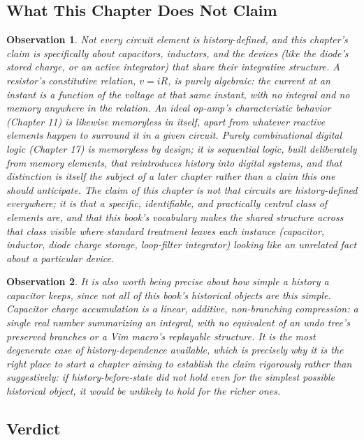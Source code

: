 \documentclass[12pt]{article}
\newtheorem{observation}{Observation}
\begin{document}
\subsection*{What This Chapter Does Not Claim}

\begin{observation}
Not every circuit element is history-defined, and this chapter's claim is specifically about capacitors, inductors, and the devices (like the diode's stored charge, or an active integrator) that share their integrative structure. A resistor's constitutive relation, $v = iR$, is purely algebraic: the current at an instant is a function of the voltage at that same instant, with no integral and no memory anywhere in the relation. An ideal op-amp's characteristic behavior (Chapter 11) is likewise memoryless in itself, apart from whatever reactive elements happen to surround it in a given circuit. Purely combinational digital logic (Chapter 17) is memoryless by design; it is sequential logic, built deliberately from memory elements, that reintroduces history into digital systems, and that distinction is itself the subject of a later chapter rather than a claim this one should anticipate. The claim of this chapter is not that circuits are history-defined everywhere; it is that a specific, identifiable, and practically central class of elements are, and that this book's vocabulary makes the shared structure across that class visible where standard treatment leaves each instance (capacitor, inductor, diode charge storage, loop-filter integrator) looking like an unrelated fact about a particular device.
\end{observation}

\begin{observation}
It is also worth being precise about how simple a history a capacitor keeps, since not all of this book's historical objects are this simple. Capacitor charge accumulation is a linear, additive, non-branching compression: a single real number summarizing an integral, with no equivalent of an undo tree's preserved branches or a Vim macro's replayable structure. It is the most degenerate case of history-dependence available, which is precisely why it is the right place to start a chapter aiming to establish the claim rigorously rather than suggestively: if history-before-state did not hold even for the simplest possible historical object, it would be unlikely to hold for the richer ones.
\end{observation}

\subsection*{Verdict}
\end{document}
